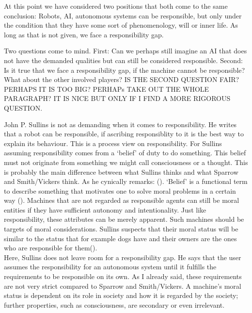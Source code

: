 \documentclass{article}
\newcounter{example}
\begin{document}
At this point we have considered two positions that both come to the same
conclusion: Robots, AI, autonomous systems can be responsible, but only under
the condition that they have some sort of phenomenology, will or inner life. As long
as that is not given, we face a responsibility gap.

Two questions come to mind. First: Can we perhaps still imagine an AI that does
not have the demanded qualities but can still be considered responsible. Second:
Is it true that we face a responsibility gap, if the machine cannot be
responsible? What about the other involved players?
IS THE SECOND QUESTION FAIR? PERHAPS IT IS TOO BIG? PERHAPs TAKE OUT THE WHOLE
PARAGRAPH? IT IS NICE BUT ONLY IF I FIND A MORE RIGOROUS QUESTION.

John P. Sullins is not as demanding when it comes to responsibility. 
He writes that a robot can be responsible, if ascribing responsiblity to it
is the best way to explain its behaviour. This is a process view on
responsibility. For Sullins assuming responsibility
comes from a `belief' of duty to do something. This belief must not originate
from something we might call consciousness or a thought. This is probably the main
difference between what Sullins thinks and what Sparrow and Smith/Vickers think.
As he cynically remarks: (\cite[p. 159]{sullins2006robot}). `Belief' is a
functional term to describe something that motivates one to solve moral problems
in a certain way (\cite[p. 159]{sullins2006robot}).
Machines that are not regarded as responsible agents can still be moral entities
if they have sufficient autonomy and intentionality. Just like responsibility,
these attributes can be merely apparent. Such machines should be targets of
moral considerations. Sullins suspects that their moral status will be similar
to the status that for example dogs have and their owners are the ones who are
responsible for them(\cite[p. 159]{sullins2006robot}).\\
Here, Sullins does not leave room for a responsibility gap. He says that the
user assumes the responsibility for an autonomous system until it fulfills the
requirements to be responsible on its own. As I already said, these requirements
are not very strict compared to Sparrow and Smith/Vickers. A machine's moral
status is dependent on its role in society and how it is regarded by the
society; further properties, such as consciousness, are secondary or even
irrelevant.
\end{document}
